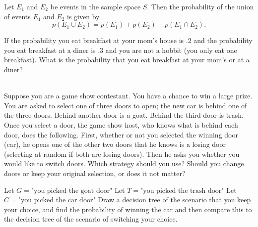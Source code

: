 \begin{exmp}
    Let $E_1$ and $E_2$ be events in the sample space $S$. Then the probability of the union of events $E_1$ and $E_2$ is given by
    \[
    p(E_1 \cup E_2) = p(E_1) + p(E_2) - p(E_1 \cap E_2).
    \]
\end{exmp}
\begin{exmp}
If the probability you eat breakfast at your mom's house is .2 and the probability you eat breakfast at a diner is .3 and you are not a hobbit (you only eat one breakfast).
What is the probability that you eat breakfast at your mom's or at a diner?
\vspace{2cm}
\end{exmp}
\begin{exmp} $ $\\ Suppose you are a game show contestant. You have a
chance to win a large prize. You are asked to select one of three doors to open; the new car
is behind one of the three doors. Behind another door is a goat. Behind the third door is trash. Once you select a door, the
game show host, who knows what is behind each door, does the following. First, whether or not
you selected the winning door (car), he opens one of the other two doors that he knows is a losing
door (selecting at random if both are losing doors). Then he asks you whether you would like to
switch doors. Which strategy should you use? Should you change doors or keep your original
selection, or does it not matter?

\noindent Let $G={\text{"you picked the goat door"}}$
\newline
Let $T={\text{"you picked the trash door"}}$
\newline
Let $C={\text{"you picked the car door"}}$
\newline
Draw a decision tree of the scenario that you keep your choice, and find the probability of winning the car and then compare this to the decision tree of the scenario of switching your choice.
\vspace{3cm}
\end{exmp}
